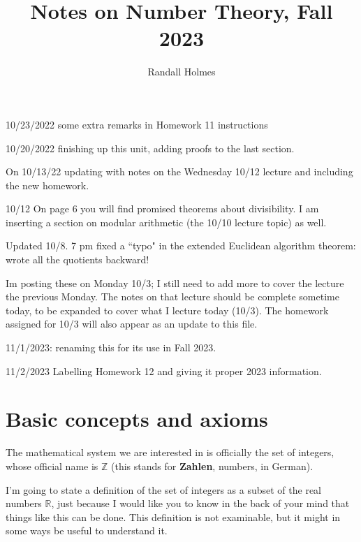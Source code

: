 \documentclass[12pt]{article}
\title{Notes on Number Theory, Fall 2023}
\author{Randall Holmes}
\begin{document}
\maketitle

10/23/2022 some extra remarks in Homework 11 instructions

10/20/2022 finishing up this unit, adding proofs to the last section.

On 10/13/22 updating with notes on the Wednesday 10/12 lecture and including the new homework.

10/12  On page 6 you will find promised theorems about divisibility.  I am inserting a section on modular arithmetic (the 10/10 lecture topic) as well.

Updated 10/8.  7 pm fixed a ``typo" in the extended Euclidean algorithm theorem:  wrote all the quotients backward!

Im posting these on Monday 10/3;  I still need to add more to cover the lecture the previous Monday.  The notes
on that lecture should be complete sometime today, to be expanded to cover what I lecture today (10/3).  The homework assigned for 10/3 will also appear as an update to this file.

11/1/2023:  renaming this for its use in Fall 2023.

11/2/2023  Labelling Homework 12 and giving it proper 2023 information.



\tableofcontents

\section{Basic concepts and axioms}

The mathematical system we are interested in is officially the set of integers, whose official name is $\mathbb Z$ (this stands for {\bf Zahlen}, numbers, in German).

I'm going to state a definition of the set of integers as a subset of the real numbers $\mathbb R$, just because I would like you to know in the back of your mind that things like this can be done.  This definition is not examinable, but it might in some ways be useful to understand it.
\end{document}
